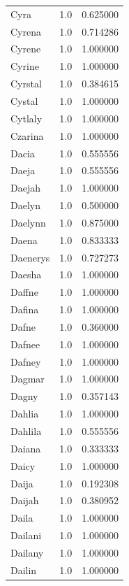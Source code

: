 \documentclass[
  letterpaper,
  DIV=11,
  numbers=noendperiod]{scrreprt}
\begin{document}
\begin{tabular}{lrr}
Cyra            &   1.0 &   0.625000 \\
Cyrena          &   1.0 &   0.714286 \\
Cyrene          &   1.0 &   1.000000 \\
Cyrine          &   1.0 &   1.000000 \\
Cyrstal         &   1.0 &   0.384615 \\
Cystal          &   1.0 &   1.000000 \\
Cytlaly         &   1.0 &   1.000000 \\
Czarina         &   1.0 &   1.000000 \\
Dacia           &   1.0 &   0.555556 \\
Daeja           &   1.0 &   0.555556 \\
Daejah          &   1.0 &   1.000000 \\
Daelyn          &   1.0 &   0.500000 \\
Daelynn         &   1.0 &   0.875000 \\
Daena           &   1.0 &   0.833333 \\
Daenerys        &   1.0 &   0.727273 \\
Daesha          &   1.0 &   1.000000 \\
Daffne          &   1.0 &   1.000000 \\
Dafina          &   1.0 &   1.000000 \\
Dafne           &   1.0 &   0.360000 \\
Dafnee          &   1.0 &   1.000000 \\
Dafney          &   1.0 &   1.000000 \\
Dagmar          &   1.0 &   1.000000 \\
Dagny           &   1.0 &   0.357143 \\
Dahlia          &   1.0 &   1.000000 \\
Dahlila         &   1.0 &   0.555556 \\
Daiana          &   1.0 &   0.333333 \\
Daicy           &   1.0 &   1.000000 \\
Daija           &   1.0 &   0.192308 \\
Daijah          &   1.0 &   0.380952 \\
Daila           &   1.0 &   1.000000 \\
Dailani         &   1.0 &   1.000000 \\
Dailany         &   1.0 &   1.000000 \\
Dailin          &   1.0 &   1.000000 \\

\end{tabular}
\end{document}
